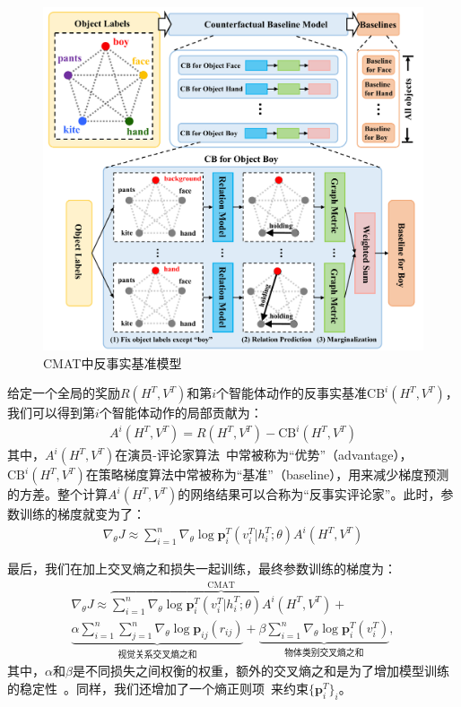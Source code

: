 \begin{figure}[h]
    \centering
        \includegraphics[width=0.8\linewidth]{chapter4/res/baseline.pdf}
    \caption{CMAT中反事实基准模型}
    \label{ch4:fig:baseline}
\end{figure}


给定一个全局的奖励$R(H^T, V^T)$和第$i$个智能体动作的反事实基准$\text{CB}^i(H^T, V^T)$，我们可以得到第$i$个智能体动作的局部贡献为：
\begin{align}
    A^i(H^T, V^T) = R(H^T, V^T) - \text{CB}^i(H^T, V^T)
\end{align}
其中，$A^i(H^T, V^T)$在演员-评论家算法~\cite{sutton2018reinforcement,mnih2016asynchronous}中常被称为“优势”（advantage），$\text{CB}^i(H^T, V^T)$在策略梯度算法中常被称为“基准”（baseline），用来减少梯度预测的方差。整个计算$A^i(H^T, V^T)$的网络结果可以合称为“反事实评论家”。此时，参数训练的梯度就变为了：
\begin{align}
\nabla_{\theta} J \approx \sum^n_{i=1} \nabla_{\theta} \log \bm{p}^T_i (v^T_i|h^T_i; \theta) A^i(H^T, V^T)
\end{align}

最后，我们在加上交叉熵之和损失一起训练，最终参数训练的梯度为：
\begin{equation}
\begin{split}
\nabla_{\theta} J \approx  \overbrace{\sum^n_{i=1} \nabla_{\theta} \log \bm{p}^T_i (v^T_i|h^T_i; \theta) A^i(H^T, V^T)}^{\text{CMAT}} + \\
\underbrace{\alpha\sum^n_{i=1}\sum^n_{j=1} \nabla_{\theta} \log \bm{p}_{ij}(r_{ij})}_{\text{视觉关系交叉熵之和}} + 
\underbrace{\beta \sum^n_{i=1} \nabla_{\theta} \log \bm{p}^T_i(v^T_i)}_{\text{物体类别交叉熵之和}},
\end{split}
\end{equation}
其中，$\alpha$和$\beta$是不同损失之间权衡的权重，额外的交叉熵之和是为了增加模型训练的稳定性~\cite{rao2018learning}。同样，我们还增加了一个熵正则项~\cite{xu2015show, hu2017learning}来约束$\{\bm{p}^T_i\}_i$。


